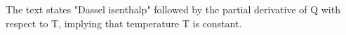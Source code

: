 The text states "Dassel isenthalp" followed by the partial derivative of Q with respect to T, implying that temperature T is constant.